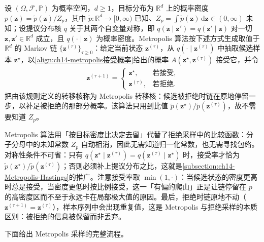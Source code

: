 \documentclass[../../main.tex]{subfiles}
\begin{document}
\begin{definition}[Metropolis 算法]\label{definition:ch14-Metropolis算法}
设 $(\Omega,\mathcal{F},\mathbb{P})$ 为概率空间，$d\geqslant1$，目标分布为 $\mathbb{R}^{d}$ 上的概率密度 $p(\bm{z})=\widetilde{p}(\bm{z})/Z_{p}$，其中 $\widetilde{p}:\mathbb{R}^{d}\to[0,\infty)$ 已知、$Z_{p}=\int\widetilde{p}(\bm{z})\,\mathrm{d}\bm{z}\in(0,\infty)$ 未知；设提议分布核 $q$ 关于其两个自变量对称，即 $q(\bm{z}\mid\bm{z}')=q(\bm{z}'\mid\bm{z})$ 对一切 $\bm{z},\bm{z}'\in\mathbb{R}^{d}$ 成立，且 $q(\cdot\mid\bm{z})$ 为概率密度。Metropolis 算法按下述方式生成取值于 $\mathbb{R}^{d}$ 的 Markov 链 $\{\bm{z}^{(\tau)}\}_{\tau\geqslant0}$：给定当前状态 $\bm{z}^{(\tau)}$，从 $q(\cdot\mid\bm{z}^{(\tau)})$ 中抽取候选样本 $\bm{z}^{\star}$，以\eqref{align:ch14-metropolis接受概率}给出的概率 $A(\bm{z}^{\star},\bm{z}^{(\tau)})$ 接受它，并令
\begin{align*}
\bm{z}^{(\tau+1)}=\begin{cases}\bm{z}^{\star}, & \text{若接受},\\ \bm{z}^{(\tau)}, & \text{若拒绝}.\end{cases}
\end{align*}
把由该规则定义的转移核称为 Metropolis 转移核：候选被拒绝时链在原地停留一步，以补足被拒绝的那部分概率。该算法只用到比值 $\widetilde{p}(\bm{z}^{\star})/\widetilde{p}(\bm{z}^{(\tau)})$，故不需要知道 $Z_{p}$。
\end{definition}

\begin{remark}Metropolis 算法用「按目标密度比决定去留」代替了拒绝采样中的比较函数：分子分母中的未知常数 $Z_{p}$ 自动相消，因此无需知道归一化常数，也无需寻找包络。对称性条件不可省：只有 $q\!\left(\bm{z}^{\star}\mid\bm{z}^{(\tau)}\right)=q\!\left(\bm{z}^{(\tau)}\mid\bm{z}^{\star}\right)$ 时，接受率才恰为 $\widetilde{p}(\bm{z}^{\star})/\widetilde{p}(\bm{z}^{(\tau)})$；否则必须补上提议分布之比，这就是\cref{subsection:ch14-Metropolis-Hastings}的推广。注意接受率取 $\min(1,\cdot)$：当候选状态的密度更高时总是接受，当密度更低时按比例接受，这一「有偏的爬山」正是让链停留在 $p$ 的高密度区而不至于永远卡在局部极大值的原因。最后，拒绝时链原地不动（$\bm{z}^{(\tau+1)}=\bm{z}^{(\tau)}$），样本序列中会出现重复值，这是 Metropolis 与拒绝采样的本质区别：被拒绝的信息被保留而非丢弃。
\end{remark}

下面给出 Metropolis 采样的完整流程。
\end{document}
